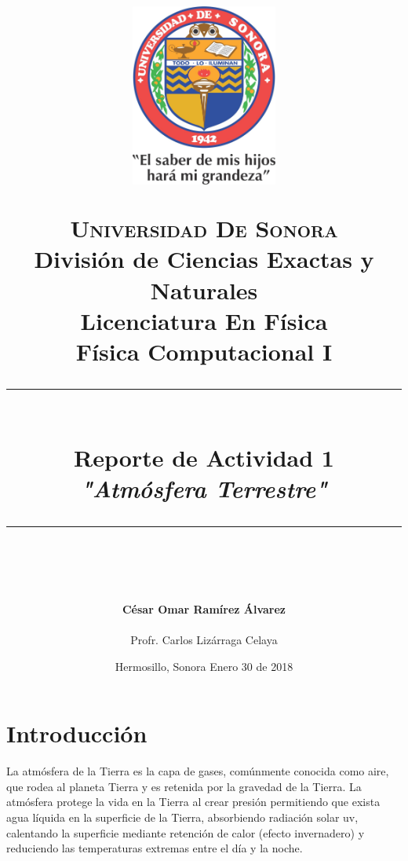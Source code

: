 \documentclass[12pt]{article}
\newcommand{\HRule}[1]{\rule{\linewidth}{#1}}
\begin{document}
\begin{titlepage}

\title{ \normalsize 
        \begin{center}
        \includegraphics[height=6cm]{Logo.jpg}
        \end{center}
        \LARGE \textsc{\textbf{Universidad De Sonora}} \\ \bigskip
		\Large División de Ciencias Exactas y Naturales \\
        Licenciatura En Física \\ \bigskip
        \bigskip
        Física Computacional I
		\\ [0.1cm]  
		\HRule{2pt} \\
		\Large \textbf{{Reporte de Actividad 1}} \\
        \textit{\textbf{"Atmósfera Terrestre"}}
		\HRule{2pt} \\
		\normalsize \vspace*{0.001\baselineskip}}
        
\date{\bigskip \Large Hermosillo, Sonora  \hspace*{\fill}  Enero 30 de 2018}

        
\author{
		\Large\textbf{ César Omar Ramírez Álvarez} \\ \bigskip
        \\ \bigskip
       \Large Profr. Carlos Lizárraga Celaya}
       \end{titlepage}
       \maketitle
       

\newpage
\pagestyle{plain}
\section{Introducción}
La atmósfera de la Tierra es la capa de gases, comúnmente conocida como aire, que rodea al planeta Tierra y es retenida por la gravedad de la Tierra. La atmósfera protege la vida en la Tierra al crear presión permitiendo que exista agua líquida en la superficie de la Tierra, absorbiendo radiación solar uv, calentando la superficie mediante retención de calor (efecto invernadero) y reduciendo las temperaturas extremas entre el día y la noche.
\end{document}
